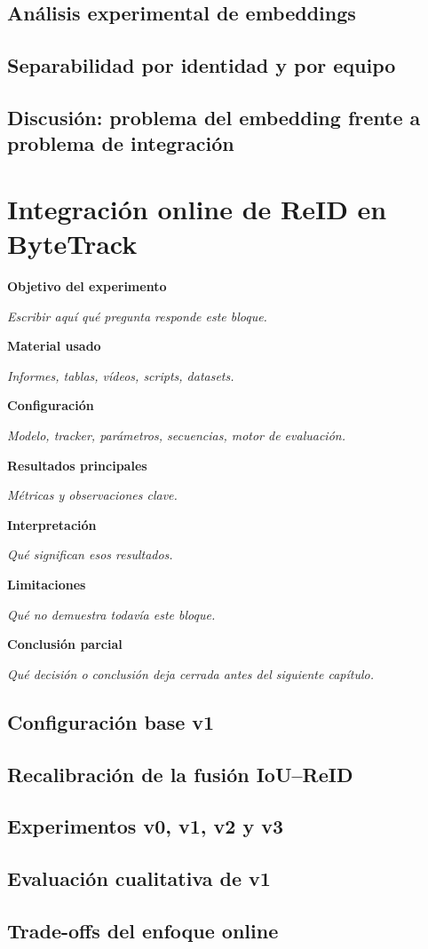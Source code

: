 \documentclass[12pt, a4paper, twoside]{article}
\newcommand{\templatefield}[2]{%
	\textbf{#1}\par
	{\color{gray!70!black}\emph{#2}}\par\vspace{0.5em}%
}
\newcommand{\experimentchaptertemplate}{%
	\begin{chaptertemplatebox}
		\templatefield{Objetivo del experimento}{Escribir aquí qué pregunta responde este bloque.}
		\templatefield{Material usado}{Informes, tablas, vídeos, scripts, datasets.}
		\templatefield{Configuración}{Modelo, tracker, parámetros, secuencias, motor de evaluación.}
		\templatefield{Resultados principales}{Métricas y observaciones clave.}
		\templatefield{Interpretación}{Qué significan esos resultados.}
		\templatefield{Limitaciones}{Qué no demuestra todavía este bloque.}
		\templatefield{Conclusión parcial}{Qué decisión o conclusión deja cerrada antes del siguiente capítulo.}
	\end{chaptertemplatebox}%
}
\begin{document}
	\subsection{Análisis experimental de embeddings}
	\subsection{Separabilidad por identidad y por equipo}
	\subsection{Discusión: problema del embedding frente a problema de integración}
	
	\newpage
	
	
	\section{Integración online de ReID en ByteTrack}
	
	\experimentchaptertemplate
	
	\subsection{Configuración base v1}
	\subsection{Recalibración de la fusión IoU--ReID}
	\subsection{Experimentos v0, v1, v2 y v3}
	\subsection{Evaluación cualitativa de v1}
	\subsection{Trade-offs del enfoque online}
	
	\newpage
	
	
\end{document}
